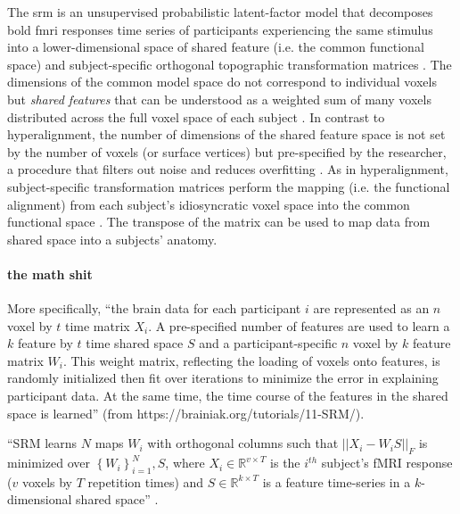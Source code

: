 %
The \ac{srm} is an unsupervised probabilistic latent-factor model that
decomposes \ac{bold} \ac{fmri} responses time series of participants
experiencing the same stimulus into a lower-dimensional space of shared feature
(i.e. the common functional space) and subject-specific orthogonal topographic
transformation matrices \citep{kumar2020brainiak, cohen2017computational}.
%
The dimensions of the common model space do not correspond to individual voxels
but \textit{shared features} that can be understood as a weighted sum of many
voxels distributed across the full voxel space of each subject
\citep{kumar2020brainiak}.
%
In contrast to hyperalignment, the number of dimensions of the shared feature
space is not set by the number of voxels (or surface vertices) but pre-specified
by the researcher, a procedure that filters out noise and reduces overfitting
\citep{chen2015reduced}.
%
As in hyperalignment, subject-specific transformation matrices perform the
mapping (i.e. the functional alignment) from each subject's idiosyncratic voxel
space into the common functional space \citep{kumar2020brainiak,
cohen2017computational}.
The transpose of the matrix can be used to map data from shared space into a
subjects' anatomy.


\paragraph{the math shit}


%
More specifically, ``the brain data for each participant $i$ are represented as
an \textbf{$n$} voxel by $t$ time matrix  $X_{i}$. A pre-specified number of
features are used to learn a $k$ feature by  $t$ time shared space $S$ and a
participant-specific $n$ voxel by $k$  feature matrix $W_{i}$. This weight
matrix, reflecting the loading of voxels onto features, is randomly initialized
then fit over iterations to minimize the error in explaining participant data.
At the same time, the time course of the features in the shared space is
learned'' (from https://brainiak.org/tutorials/11-SRM/).

%
``SRM learns $N$ maps $W_{i}$ with orthogonal columns such that
$||X_{i}-W_{i}S||_{F}$ is minimized over $\left\{ W_{i}\right\} _{i=1}^{N},S$,
where $X_{i}\in\mathbb{R}^{v\times{T}}$ is the $i^{th}$ subject's fMRI response
($v$ voxels by $T$ repetition times) and $S\in\mathbb{R}^{k\times{T}}$ is a
feature time-series in a $k$-dimensional shared space''
\citep{vodrahalli2018mapping}.


